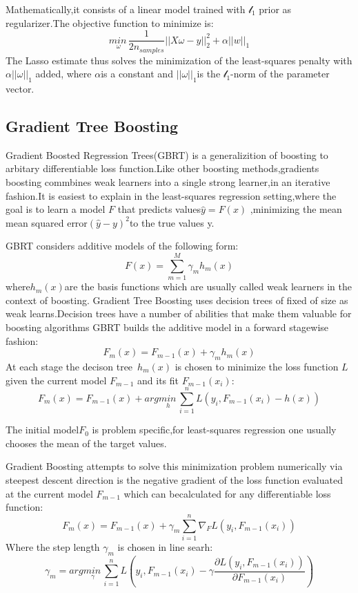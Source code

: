 \documentclass[10pt,a4paper]{ctexart}
\begin{document}
    Mathematically,it consists of a linear model trained with $\mathcal{l}_1$ prior as regularizer.The objective function to minimize is:
    \begin{equation*}
    	\underset{\omega}{min\,}{\dfrac{1}{2n_{samples}}||X\omega-y||_2^2}+\alpha||w||_1
    \end{equation*}
    The Lasso estimate thus solves the minimization of the least-squares penalty with $\alpha||\omega||_1$ added,
    where $\alpha$is a constant and $||\omega||_1$is the $\mathcal{l}_1$-norm of the parameter vector.
    \subsection{Gradient Tree Boosting}
    Gradient Boosted Regression Trees(GBRT) is a generalizition of boosting to arbitary
    differentiable loss function.Like other boosting methods,gradients boosting commbines weak learners into a single strong learner,in an iterative
    fashion.It is easiest to explain in the least-squares regression setting,where the goal is to learn a model $F$ that predicts values$\hat{y}=F(x)$
    ,minimizing the mean mean squared error$(\hat{y}-y)^2$to the true values y.
    
    GBRT considers additive models of the following form:
    \begin{equation*}
        F(x)=\sum_{m=1}^{M}\gamma_{m}h_m(x)
    \end{equation*}
    where$h_m(x)$are the basis functions which are usually called weak learners in the context of boosting.
    Gradient Tree Boosting uses decision trees of fixed of size as weak learns.Decision trees have a number of 
    abilities that make them valuable for boosting algorithms GBRT builds the additive model in a forward stagewise fashion:
    \begin{equation*}
        F_m(x)=F_{m-1}(x)+\gamma_mh_m(x)
    \end{equation*}
    At each stage the decison tree\ $h_m(x)$ is chosen to minimize the loss function $L$ given the current model
    $F_{m-1}$ and its fit $F_{m-1}(x_i)$:
    \begin{equation*}
        F_m(x)=F_{m-1}(x)+arg\underset{h}{min\,}\sum_{i=1}^{n}L(y_i,F_{m-1}(x_i)-h(x))
    \end{equation*}

    The initial model$F_0$ is problem specific,for least-squares regression one usually chooses the mean of the target values.

    Gradient Boosting attempts to solve this minimization problem numerically via steepest descent
    direction is the negative gradient of the loss function evaluated at the current model $F_{m-1}$ which can becalculated for 
    any differentiable loss function:
    \begin{equation*}
        F_m(x)=F_{m-1}(x)+\gamma_m\sum_{i=1}^{n}\nabla_{F}L(y_i,F_{m-1}(x_i))
    \end{equation*}
    Where the step length $\gamma_m$ is chosen in line searh:
    \begin{equation*}
    \gamma_m=arg\underset{\gamma}{min\,}\sum_{i=1}^{n}L(y_i,F_{m-1}(x_i)-\gamma\dfrac{\partial L(y_i,F_{m-1}(x_i))}{\partial F_{m-1}(x_i)})
    \end{equation*}
\end{document}
